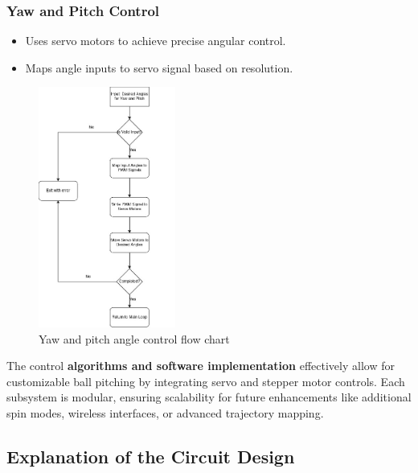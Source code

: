 \documentclass[12pt]{report}
\begin{document}
\subsubsection{Yaw and Pitch Control}
\begin{itemize}
    \item Uses servo motors to achieve precise angular control.
    \item Maps angle inputs to servo signal  based on resolution.
\end{itemize}

\begin{figure}[H]
    \centering
    \includegraphics[width=0.40\textwidth]{CH5 figureler/salih figureler/yaw and pitch control flow chart.jpg}
    \caption{Yaw and pitch angle control flow chart}
    \label{fig:Yaw and pitch angle control flow chart}
\end{figure}

The control \textbf{ algorithms and software implementation} effectively allow for customizable ball pitching by integrating servo and stepper motor controls. Each subsystem is modular, ensuring scalability for future enhancements like additional spin modes, wireless interfaces, or advanced trajectory mapping.

\subsection{Explanation of the Circuit Design}
\end{document}
